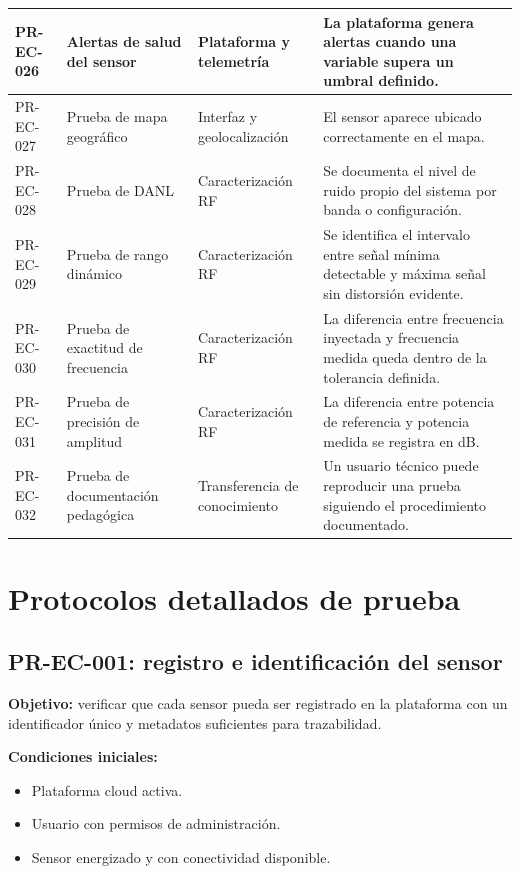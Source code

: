 \begin{longtable}{|>{\raggedright\arraybackslash}p{1.6cm}|>{\raggedright\arraybackslash}p{3.2cm}|>{\raggedright\arraybackslash}p{3.2cm}|>{\raggedright\arraybackslash}p{5.0cm}|}
PR-EC-026 & Alertas de salud del sensor & Plataforma y telemetría & La plataforma genera alertas cuando una variable supera un umbral definido. \\
\hline
PR-EC-027 & Prueba de mapa geográfico & Interfaz y geolocalización & El sensor aparece ubicado correctamente en el mapa. \\
\hline
PR-EC-028 & Prueba de DANL & Caracterización RF & Se documenta el nivel de ruido propio del sistema por banda o configuración. \\
\hline
PR-EC-029 & Prueba de rango dinámico & Caracterización RF & Se identifica el intervalo entre señal mínima detectable y máxima señal sin distorsión evidente. \\
\hline
PR-EC-030 & Prueba de exactitud de frecuencia & Caracterización RF & La diferencia entre frecuencia inyectada y frecuencia medida queda dentro de la tolerancia definida. \\
\hline
PR-EC-031 & Prueba de precisión de amplitud & Caracterización RF & La diferencia entre potencia de referencia y potencia medida se registra en dB. \\
\hline
PR-EC-032 & Prueba de documentación pedagógica & Transferencia de conocimiento & Un usuario técnico puede reproducir una prueba siguiendo el procedimiento documentado. \\
\hline
\end{longtable}
\endgroup
\color{black}

\section{Protocolos detallados de prueba}

\subsection{PR-EC-001: registro e identificación del sensor}

\textbf{Objetivo:} verificar que cada sensor pueda ser registrado en la plataforma con un identificador único y metadatos suficientes para trazabilidad.

\textbf{Condiciones iniciales:}

\begin{itemize}
    \item Plataforma cloud activa.
    \item Usuario con permisos de administración.
    \item Sensor energizado y con conectividad disponible.
\end{itemize}

